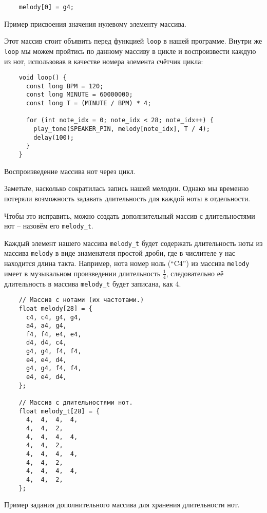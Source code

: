 \documentclass[../sparc.tex]{subfiles}
\begin{document}
\begin{listing}[ht]
  \begin{verbatim}
    melody[0] = g4;
  \end{verbatim}
  \label{listing:music-array-example-2}
  \caption{Пример присвоения значения нулевому элементу массива.}
\end{listing}

Этот массив стоит объявить перед функцией \texttt{loop} в нашей программе.
Внутри же \texttt{loop} мы можем пройтись по данному массиву в цикле и
воспроизвести каждую из нот, использовав в качестве номера элемента счётчик
цикла:

\begin{listing}[ht]
  \begin{verbatim}
    void loop() {
      const long BPM = 120;
      const long MINUTE = 60000000;
      const long T = (MINUTE / BPM) * 4;

      for (int note_idx = 0; note_idx < 28; note_idx++) {
        play_tone(SPEAKER_PIN, melody[note_idx], T / 4);
        delay(100);
      }
    }
  \end{verbatim}
  \label{listing:music-array-example-3}
  \caption{Воспроизведение массива нот через цикл.}
\end{listing}

Заметьте, насколько сократилась запись нашей мелодии. Однако мы временно
потеряли возможность задавать длительность для каждой ноты в отдельности.

Чтобы это исправить, можно создать дополнительный массив с длительностями нот --
назовём его \texttt{melody\_t}.

Каждый элемент нашего массива \texttt{melody\_t} будет содержать длительность
ноты из массива \texttt{melody} в виде знаменателя простой дроби, где в
числителе у нас находится длина такта. Например, нота номер ноль (``C4'') из
массива \texttt{melody} имеет в музыкальном произведении длительность
$\frac{1}{4}$, следовательно её длительность в массива \texttt{melody\_t} будет
записана, как 4.

\begin{listing}[H]
  \begin{verbatim}
    // Массив с нотами (их частотами.)
    float melody[28] = {
      c4, c4, g4, g4,
      a4, a4, g4,
      f4, f4, e4, e4,
      d4, d4, c4,
      g4, g4, f4, f4,
      e4, e4, d4,
      g4, g4, f4, f4,
      e4, e4, d4,
    };

    // Массив с длительностями нот.
    float melody_t[28] = {
      4,  4,  4,  4,
      4,  4,  2,
      4,  4,  4,  4,
      4,  4,  2,
      4,  4,  4,  4,
      4,  4,  2,
      4,  4,  4,  4,
      4,  4,  2,
    };
  \end{verbatim}
  \label{listing:music-array-example-4}
  \caption{Пример задания дополнительного массива для хранения длительности
    нот.}
\end{listing}
\end{document}
